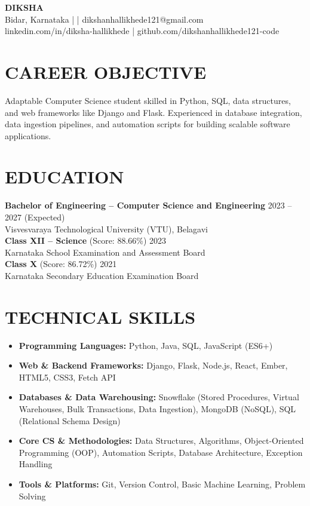 \documentclass[10pt,letterpaper]{article}
\begin{document}
\begin{center}
    {\Huge \textbf{DIKSHA}} \\[6pt]
    Bidar, Karnataka \quad |  \quad | \quad dikshanhallikhede121@gmail.com \\
    linkedin.com/in/diksha-hallikhede \quad | \quad github.com/dikshanhallikhede121-code
\end{center}

\vspace{-5pt}

\section*{CAREER OBJECTIVE}
Adaptable Computer Science student skilled in Python, SQL, data structures, and web frameworks like Django and Flask. Experienced in database integration, data ingestion pipelines, and automation scripts for building scalable software applications.

\section*{EDUCATION}
\noindent \textbf{Bachelor of Engineering – Computer Science and Engineering} \hfill 2023 -- 2027 (Expected) \\
Visvesvaraya Technological University (VTU), Belagavi \\
\noindent \textbf{Class XII – Science} (Score: 88.66\%) \hfill 2023 \\
Karnataka School Examination and Assessment Board \\
\noindent \textbf{Class X} (Score: 86.72\%) \hfill 2021 \\
Karnataka Secondary Education Examination Board

\section*{TECHNICAL SKILLS}
\begin{itemize}
    \item[] \textbf{Programming Languages:} Python, Java, SQL, JavaScript (ES6+)
    \item[] \textbf{Web \& Backend Frameworks:} Django, Flask, Node.js, React, Ember, HTML5, CSS3, Fetch API
    \item[] \textbf{Databases \& Data Warehousing:} Snowflake (Stored Procedures, Virtual Warehouses, Bulk Transactions, Data Ingestion), MongoDB (NoSQL), SQL (Relational Schema Design)
    \item[] \textbf{Core CS \& Methodologies:} Data Structures, Algorithms, Object-Oriented Programming (OOP), Automation Scripts, Database Architecture, Exception Handling
    \item[] \textbf{Tools \& Platforms:} Git, Version Control, Basic Machine Learning, Problem Solving
\end{itemize}
\end{document}
